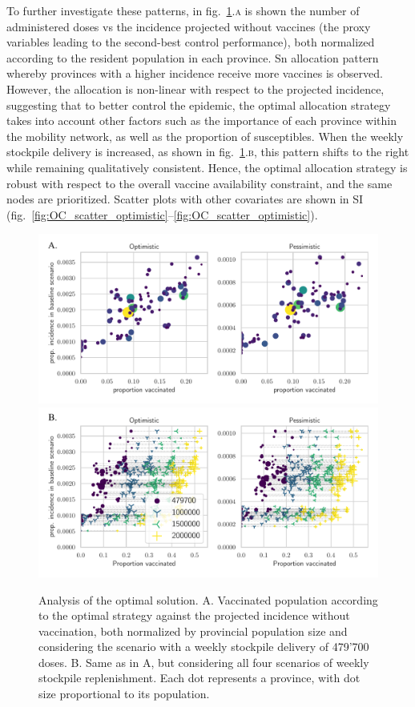 To further investigate these patterns, in fig.~\ref{fig:OC_scatter}.\textsc{a} is shown the number of administered doses vs the incidence projected without vaccines (the proxy variables leading to the second-best control performance), both normalized according to the resident population in each province. Sn allocation pattern whereby provinces with a higher incidence receive more vaccines is observed. However, the allocation is non-linear with respect to the projected incidence, suggesting that to better control the epidemic, the optimal allocation strategy takes into account other factors such as the importance of each province within the mobility network, as well as the proportion of susceptibles. When the weekly stockpile delivery is increased, as shown in fig.~\ref{fig:OC_scatter}.\textsc{b}, this pattern shifts to the right while remaining qualitatively consistent. Hence, the optimal allocation strategy is robust with respect to the overall vaccine availability constraint, and the same nodes are prioritized. Scatter plots with other covariates are shown in SI (fig.~\ref{fig:OC_scatter_optimistic}--\ref{fig:OC_scatter_optimistic}). 

\begin{figure}[!ht]
\centering
\includegraphics{fig_italy-ocp/figures/scatter_top.pdf}
\includegraphics{fig_italy-ocp/figures/scatter_scn.pdf}
\caption[Analysis of the optimal solution]{Analysis of the optimal solution. A. Vaccinated population according to the optimal strategy against the projected incidence without vaccination, both normalized by provincial population size and considering the scenario with a weekly stockpile delivery of 479'700 doses. B. Same as in A, but considering all four scenarios of weekly stockpile replenishment. Each dot represents a province, with dot size proportional to its population.}
    \label{fig:OC_scatter}
\end{figure}



